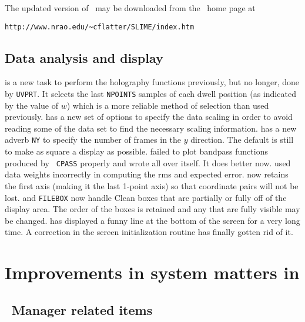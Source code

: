 The updated version of \SLIME\ may be downloaded from the \SLIME\ home
page at\\
\centerline{{\tt http://www.nrao.edu/\~{}cflatter/SLIME/index.htm}}

\subsection{Data analysis and display}

\begin{description}
 is a new task to perform the holography functions
    previously, but no longer, done by {\tt UVPRT}\@.  It selects the
    last {\tt NPOINTS} samples of each dwell position (as indicated by
    the value of $w$) which is a more reliable method of selection
    than used previously.
 has a new set of options to specify the data scaling
    in order to avoid reading some of the data set to find the
    necessary scaling information.
 has a new adverb {\tt NY} to specify the number of
    frames in the $y$ direction.  The default is still to make as
    square a display as possible.
 failed to plot bandpass functions produced by {\tt
    CPASS} properly and wrote all over itself.  It does better now.
 used data weights incorrectly in computing the rms and
    expected error.
 now retains the first axis (making it the last 1-point
    axis) so that coordinate pairs will not be lost.
 and {\tt FILEBOX} now handle Clean boxes that are
    partially or fully off of the display area.  The order of the
    boxes is retained and any that are fully visible may be changed.
 has displayed a funny line at the bottom of the screen
    for a very long time.  A correction in the screen initialization
    routine has finally gotten rid of it.
\end{description}

\section{Improvements in system matters in \RELEASENAME}

\subsection{\AIPS\ Manager related items}

